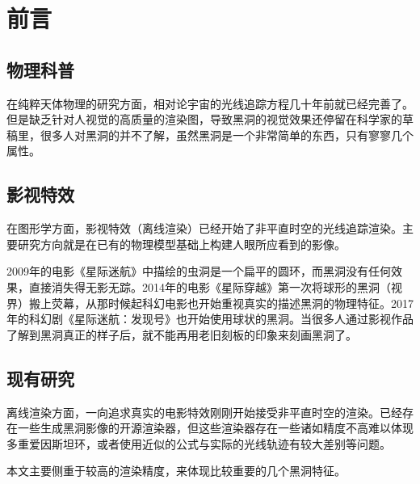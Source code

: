 %
%
%
%
%
%

\chapter{前言}
\section{物理科普}
在纯粹天体物理的研究方面，相对论宇宙的光线追踪方程几十年前就已经完善了。但是缺乏针对人视觉的高质量的渲染图，导致黑洞的视觉效果还停留在科学家的草稿里，很多人对黑洞的并不了解，虽然黑洞是一个非常简单的东西，只有寥寥几个属性。

\section{影视特效}
在图形学方面，影视特效（离线渲染）已经开始了非平直时空的光线追踪渲染。主要研究方向就是在已有的物理模型基础上构建人眼所应看到的影像。

2009年的电影《星际迷航》中描绘的虫洞是一个扁平的圆环，而黑洞没有任何效果，直接消失得无影无踪。2014年的电影《星际穿越》第一次将球形的黑洞（视界）搬上荧幕，从那时候起科幻电影也开始重视真实的描述黑洞的物理特征。2017年的科幻剧《星际迷航：发现号》也开始使用球状的黑洞。当很多人通过影视作品了解到黑洞真正的样子后，就不能再用老旧刻板的印象来刻画黑洞了。

\section{现有研究}
离线渲染方面，一向追求真实的电影特效刚刚开始接受非平直时空的渲染。已经存在一些生成黑洞影像的开源渲染器，但这些渲染器存在一些诸如精度不高难以体现多重爱因斯坦环，或者使用近似的公式与实际的光线轨迹有较大差别等问题。

本文主要侧重于较高的渲染精度，来体现比较重要的几个黑洞特征。
